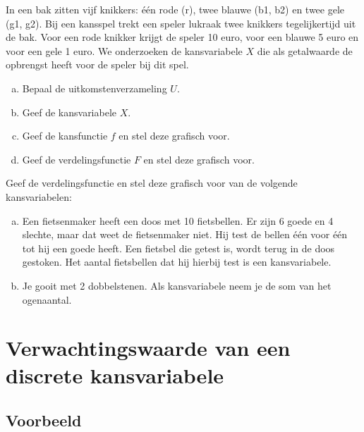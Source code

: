 \documentclass[a4paper,12pt, twoside]{article}
\begin{document}
\begin{oefening}
In een bak zitten vijf knikkers: één rode (r), twee blauwe (b1, b2) en twee gele (g1, g2). Bij een kansspel trekt een speler lukraak twee knikkers tegelijkertijd uit de bak. Voor een rode knikker krijgt de speler 10 euro, voor een blauwe 5 euro en voor een gele 1 euro.
We onderzoeken de kansvariabele $X$ die als getalwaarde de opbrengst heeft voor de speler bij dit spel.
\begin{enumerate}[(a)]
  \item Bepaal de uitkomstenverzameling $U$.
  \item Geef de kansvariabele $X$.
  \item Geef de kansfunctie $f$ en stel deze grafisch voor.
  \item Geef de verdelingsfunctie $F$ en stel deze grafisch voor.
\end{enumerate}
\end{oefening}

\begin{oefening}
Geef de verdelingsfunctie en stel deze grafisch voor van de volgende kansvariabelen:
\begin{enumerate}[(a)]
  \item Een fietsenmaker heeft een doos met 10 fietsbellen. Er zijn 6 goede en 4 slechte, maar dat weet de fietsenmaker niet. Hij test de bellen één voor één tot hij een goede heeft. Een fietsbel die getest is, wordt terug in de doos gestoken. Het aantal fietsbellen dat hij hierbij test is een kansvariabele.
  \item Je gooit met 2 dobbelstenen. Als kansvariabele neem je de som van het ogenaantal.
\end{enumerate}
\end{oefening}

\cleardoublepage
\section{Verwachtingswaarde van een discrete kansvariabele}

\subsection{Voorbeeld}
\end{document}
